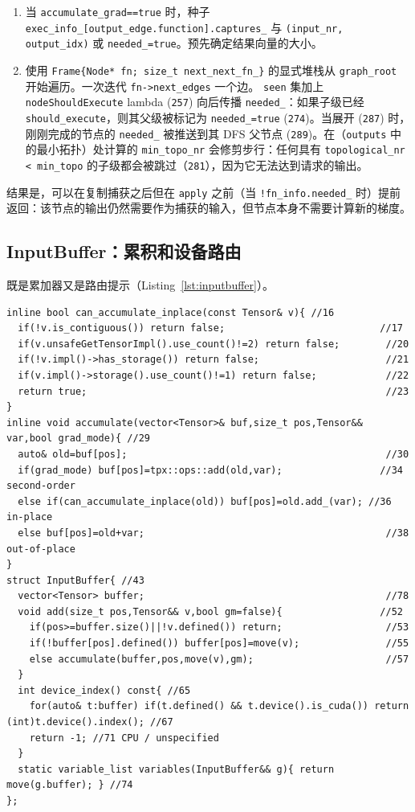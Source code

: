 \begin{enumerate}[leftmargin=1.2em]
\item 当 \texttt{accumulate\_grad==true} 时，种子 \texttt{exec\_info\_[output\_edge.function].captures\_} 与 \texttt{(input\_nr, output\_idx)} 或 \texttt{needed\_=true}。预先确定结果向量的大小。
\item 使用 \texttt{Frame\{Node* fn; size\_t next\_next\_fn\_\}} 的显式堆栈从 \texttt{graph\_root} 开始遍历。一次迭代 \texttt{fn->next\_edges} 一个边。 \texttt{seen} 集加上 \texttt{nodeShouldExecute} lambda (\texttt{257}) 向后传播 \texttt{needed\_}：如果子级已经 \texttt{should\_execute}，则其父级被标记为 \texttt{needed\_=true} (\texttt{274})。当展开 (\texttt{287}) 时，刚刚完成的节点的 \texttt{needed\_} 被推送到其 DFS 父节点 (\texttt{289})。在（\texttt{outputs} 中的最小拓扑）处计算的 \texttt{min\_topo\_nr} 会修剪步行：任何具有 \texttt{topological\_nr < min\_topo} 的子级都会被跳过（\texttt{281}），因为它无法达到请求的输出。
\end{enumerate}

结果是，可以在复制捕获之后但在 \texttt{apply} 之前（当 \texttt{!fn\_info.needed\_} 时）提前返回：该节点的输出仍然需要作为捕获的输入，但节点本身不需要计算新的梯度。

\subsection{InputBuffer：累积和设备路由}
\label{subsec:inputbuffer}

既是累加器又是路由提示（Listing~\ref{lst:inputbuffer}）。

\begin{lstlisting}[caption={accumulation.}, label=lst:inputbuffer]
inline bool can_accumulate_inplace(const Tensor& v){ //16
  if(!v.is_contiguous()) return false;                           //17
  if(v.unsafeGetTensorImpl().use_count()!=2) return false;        //20
  if(!v.impl()->has_storage()) return false;                      //21
  if(v.impl()->storage().use_count()!=1) return false;            //22
  return true;                                                    //23
}
inline void accumulate(vector<Tensor>& buf,size_t pos,Tensor&& var,bool grad_mode){ //29
  auto& old=buf[pos];                                             //30
  if(grad_mode) buf[pos]=tpx::ops::add(old,var);                 //34 second-order
  else if(can_accumulate_inplace(old)) buf[pos]=old.add_(var); //36 in-place
  else buf[pos]=old+var;                                          //38 out-of-place
}
struct InputBuffer{ //43
  vector<Tensor> buffer;                                          //78
  void add(size_t pos,Tensor&& v,bool gm=false){                 //52
    if(pos>=buffer.size()||!v.defined()) return;                  //53
    if(!buffer[pos].defined()) buffer[pos]=move(v);               //55
    else accumulate(buffer,pos,move(v),gm);                       //57
  }
  int device_index() const{ //65
    for(auto& t:buffer) if(t.defined() && t.device().is_cuda()) return (int)t.device().index(); //67
    return -1; //71 CPU / unspecified
  }
  static variable_list variables(InputBuffer&& g){ return move(g.buffer); } //74
};
\end{lstlisting}

